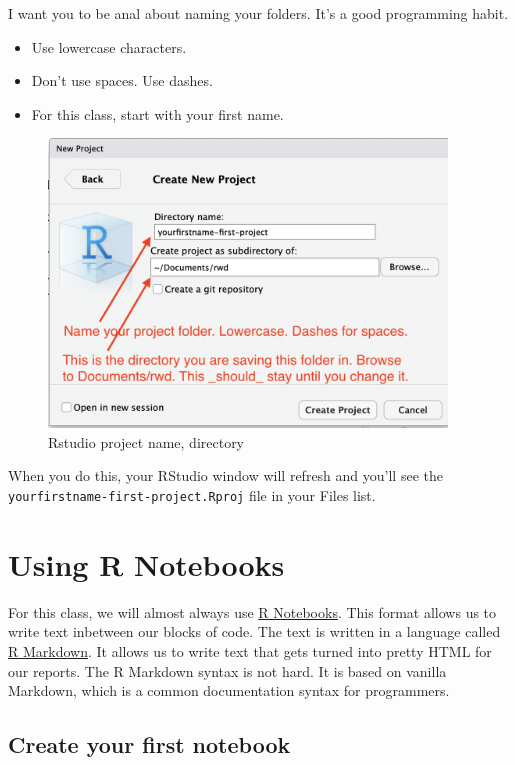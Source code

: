 \documentclass[]{book}
\providecommand{\tightlist}{%
  \setlength{\itemsep}{0pt}\setlength{\parskip}{0pt}}
\begin{document}
I want you to be anal about naming your folders. It's a good programming
habit.

\begin{itemize}
\tightlist
\item
  Use lowercase characters.
\item
  Don't use spaces. Use dashes.
\item
  For this class, start with your first name.
\end{itemize}

\begin{figure}
\centering
\includegraphics[width=4.16667in]{images/02-rstudio-newproject.png}
\caption{Rstudio project name, directory}
\end{figure}

When you do this, your RStudio window will refresh and you'll see the
\texttt{yourfirstname-first-project.Rproj} file in your Files list.

\section{Using R Notebooks}\label{using-r-notebooks}

For this class, we will almost always use
\href{https://rmarkdown.rstudio.com/lesson-10.html}{R Notebooks}. This
format allows us to write text inbetween our blocks of code. The text is
written in a language called
\href{https://rmarkdown.rstudio.com/lesson-1.html}{R Markdown}. It
allows us to write text that gets turned into pretty HTML for our
reports. The R Markdown syntax is not hard. It is based on vanilla
Markdown, which is a common documentation syntax for programmers.

\subsection{Create your first
notebook}\label{create-your-first-notebook}
\end{document}
